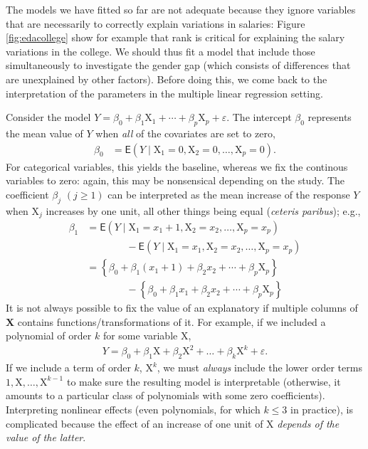 \documentclass[
  11pt,
  letterpaper,
]{book}
\theoremstyle{definition}
\theoremstyle{definition}
\theoremstyle{definition}
\theoremstyle{definition}
\theoremstyle{remark}
\begin{document}
The models we have fitted so far are not adequate because they ignore variables that are necessarily to correctly explain variations in salaries: Figure \ref{fig:edacollege} show for example that rank is critical for explaining the salary variations in the college. We should thus fit a model that include those simultaneously to investigate the gender gap (which consists of differences that are unexplained by other factors). Before doing this, we come back to the interpretation of the parameters in the multiple linear regression setting.

Consider the model \(Y= \beta_0 + \beta_1 \mathrm{X}_1 + \cdots + \beta_p\mathrm{X}_p + \varepsilon\). The intercept \(\beta_0\) represents the mean value of \(Y\) when \emph{all} of the covariates are set to zero,
\begin{align*}
\beta_0 &= \mathsf{E}(Y \mid \mathrm{X}_1=0,\mathrm{X}_2=0,\ldots,\mathrm{X}_p=0).
\end{align*}
For categorical variables, this yields the baseline, whereas we fix the continous variables to zero: again, this may be nonsensical depending on the study. The coefficient \(\beta_j\) \((j \geq 1)\) can be interpreted as the mean increase of the response \(Y\) when \(\mathrm{X}_j\) increases by one unit, all other things being equal (\emph{ceteris paribus}); e.g.,
\begin{align*}
\beta_1 &= \mathsf{E}(Y \mid \mathrm{X}_1=x_1+1,\mathrm{X}_2=x_2,\ldots,\mathrm{X}_p=x_p) \\
& \qquad \qquad - \mathsf{E}(Y \mid \mathrm{X}_1=x_1,\mathrm{X}_2=x_2,\ldots,\mathrm{X}_p=x_p) \\
&= \left\{\beta_0 + \beta_1 (x_1+1) + \beta_2 x_2 + \cdots +\beta_p \mathrm{X}_p \right\} \\
& \qquad \qquad -\left\{\beta_0 + \beta_1 x_1 + \beta_2 x_2 + \cdots +\beta_p \mathrm{X}_p \right\}
\end{align*}
It is not always possible to fix the value of an explanatory if multiple columns of \(\mathbf{X}\) contains functions/transformations of it. For example, if we included a polynomial of order \(k\) for some variable \(\mathrm{X}\),
\begin{align*}
Y=\beta_0+ \beta_1 \mathrm{X}+ \beta_2 \mathrm{X}^2 + \ldots +\beta_k \mathrm{X}^k + \varepsilon.
\end{align*}
If we include a term of order \(k\), \(\mathrm{X}^k\), we must \emph{always} include the lower order terms \(1, \mathrm{X}, \ldots, \mathrm{X}^{k-1}\) to make sure the resulting model is interpretable (otherwise, it amounts to a particular class of polynomials with some zero coefficients). Interpreting nonlinear effects (even polynomials, for which \(k\leq 3\) in practice), is complicated because the effect of an increase of one unit of \(\mathrm{X}\) \emph{depends of the value of the latter}.
\end{document}
